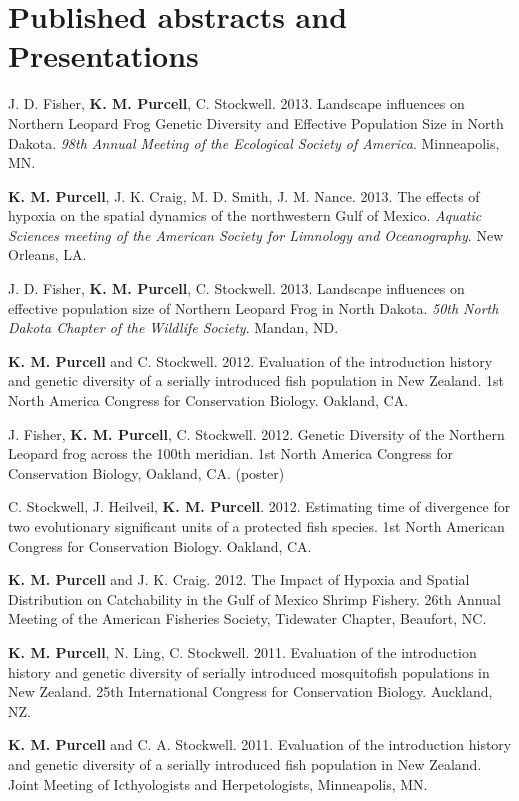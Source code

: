 \documentclass[letterpaper]{article}
\renewenvironment{itemize}{
  \begin{list}{}{
    \setlength{\leftmargin}{1em}
  }
}{
  \end{list}
}
\begin{document}
\section*{Published abstracts and Presentations}
	\begin{itemize}
  	\item J. D. Fisher, \textbf{K. M. Purcell}, C. Stockwell. 2013. Landscape influences on Northern Leopard Frog Genetic Diversity and Effective Population Size in North Dakota. \textit{98th Annual Meeting of the Ecological Society of America}. Minneapolis, MN.
    \item \textbf{K. M. Purcell}, J. K. Craig, M. D. Smith, J. M. Nance. 2013. The effects of hypoxia on the spatial dynamics of the northwestern Gulf of Mexico. \textit{Aquatic Sciences meeting of the American Society for Limnology and Oceanography}. New Orleans, LA.
		\item J. D. Fisher, \textbf{K. M. Purcell}, C. Stockwell. 2013. Landscape influences on effective population size of Northern Leopard Frog in North Dakota. \textit{50th North Dakota Chapter of the Wildlife Society}. Mandan, ND.
		\item \textbf{K. M. Purcell} and C. Stockwell. 2012. Evaluation of the introduction history and genetic diversity of a serially introduced fish population in New Zealand. 1st North America Congress for Conservation Biology. Oakland, CA.
		\item J. Fisher, \textbf{K. M. Purcell}, C. Stockwell. 2012. Genetic Diversity of the Northern Leopard frog across the 100th meridian. 1st North America Congress for Conservation Biology, Oakland, CA. (poster)
		\item C. Stockwell, J. Heilveil, \textbf{K. M. Purcell}. 2012. Estimating time of divergence for two evolutionary significant units of a protected fish species. 1st North American Congress for Conservation Biology. Oakland, CA.
		\item \textbf{K. M. Purcell} and J. K. Craig. 2012. The Impact of Hypoxia and Spatial Distribution on Catchability in the Gulf of Mexico Shrimp Fishery. 26th Annual Meeting of the American Fisheries Society, Tidewater Chapter, Beaufort, NC.
		\item \textbf{K. M. Purcell}, N. Ling, C. Stockwell. 2011. Evaluation of the introduction history and genetic diversity of serially introduced mosquitofish populations in New Zealand. 25th International Congress for Conservation Biology. Auckland, NZ.
		\item \textbf{K. M. Purcell} and C. A. Stockwell. 2011. Evaluation of the introduction history and genetic diversity of a serially introduced fish population in New Zealand. Joint Meeting of Icthyologists and Herpetologists, Minneapolis, MN.

\end{itemize}
\end{document}
